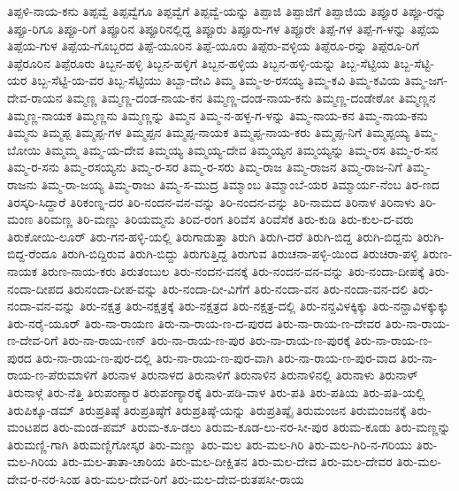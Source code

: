ತಿಪ್ಪಳಿ-ನಾಯ-ಕನು
ತಿಪ್ಪವ್ವೆ
ತಿಪ್ಪವ್ವೆಗೂ
ತಿಪ್ಪವ್ವೆಗೆ
ತಿಪ್ಪವ್ವೆ-ಯನ್ನು
ತಿಪ್ಪಾಜಿ
ತಿಪ್ಪಾಜಿಗೆ
ತಿಪ್ಪಾಜಿಯ
ತಿಪ್ಪೂರ
ತಿಪ್ಪೂ-ರನ್ನು
ತಿಪ್ಪೂ-ರಿಗೂ
ತಿಪ್ಪೂ-ರಿಗೆ
ತಿಪ್ಪೂರಿನ
ತಿಪ್ಪೂರಿನಲ್ಲಿದ್ದ
ತಿಪ್ಪೂರು
ತಿಪ್ಪೂರು-ಗಳ
ತಿಪ್ಪೂರೇ
ತಿಪ್ಪೆ-ಗಳ
ತಿಪ್ಪೆ-ಗ-ಳನ್ನು
ತಿಪ್ಪೆಯ
ತಿಪ್ಪೆಯ-ಗುಳ
ತಿಪ್ಪೆಯ-ಗೊಬ್ಬರದ
ತಿಪ್ಪೆ-ಯೂರಿನ
ತಿಪ್ಪೆ-ಯೂರು
ತಿಪ್ಪೆರು-ವಳ್ಳಿಯ
ತಿಪ್ಪೆರೂ-ರನ್ನು
ತಿಪ್ಪೆರೂ-ರಿಗೆ
ತಿಪ್ಪೆರೂರಿನ
ತಿಪ್ಪೆರೂರು
ತಿಬ್ಬನ-ಹಳ್ಳಿ
ತಿಬ್ಬನ-ಹಳ್ಳಿಗೆ
ತಿಬ್ಬನ-ಹಳ್ಳಿಯ
ತಿಬ್ಬನ-ಹಳ್ಳಿ-ಯನ್ನು
ತಿಬ್ಬ-ಸೆಟ್ಟಿಯ
ತಿಬ್ಬ-ಸೆಟ್ಟಿ-ಯರ
ತಿಬ್ಬ-ಸೆಟ್ಟಿ-ಯ-ವರ
ತಿಬ್ಬ-ಸೆಟ್ಟಿಯು
ತಿಬ್ಬಾ-ದೇವಿ
ತಿಮ್ಮ
ತಿಮ್ಮ-ಅ-ರಸಯ್ಯ
ತಿಮ್ಮ-ಕವಿ
ತಿಮ್ಮ-ಕವಿಯ
ತಿಮ್ಮ-ಜಗ-ದೇವ-ರಾಯನ
ತಿಮ್ಮಣ್ಣ
ತಿಮ್ಮಣ್ಣ-ದಂಡ-ನಾಯ-ಕನ
ತಿಮ್ಮಣ್ಣ-ದಂಡ-ನಾಯ-ಕನು
ತಿಮ್ಮಣ್ಣ-ದಂಡೇಠೋ
ತಿಮ್ಮಣ್ಣನ
ತಿಮ್ಮಣ್ಣ-ನಾಯಕ
ತಿಮ್ಮಣ್ಣನು
ತಿಮ್ಮಣ್ಣನ್ನು
ತಿಮ್ಮನ
ತಿಮ್ಮ-ನ-ಹಳ್ಳ-ಗ-ಳನ್ನು
ತಿಮ್ಮ-ನಾಯ-ಕನ
ತಿಮ್ಮ-ನಾಯ-ಕನು
ತಿಮ್ಮನು
ತಿಮ್ಮಪ್ಪ
ತಿಮ್ಮಪ್ಪ-ಗಳ
ತಿಮ್ಮಪ್ಪನ
ತಿಮ್ಮಪ್ಪ-ನಾಯಕ
ತಿಮ್ಮಪ್ಪ-ನಾಯ-ಕರು
ತಿಮ್ಮಪ್ಪ-ನಿಗೆ
ತಿಮ್ಮಪ್ಪಯ್ಯ
ತಿಮ್ಮ-ಬೋಯಿ
ತಿಮ್ಮಮ್ಮ
ತಿಮ್ಮ-ಯ-ದೇವ
ತಿಮ್ಮಯ್ಯ
ತಿಮ್ಮಯ್ಯ-ದೇವ
ತಿಮ್ಮಯ್ಯನ
ತಿಮ್ಮಯ್ಯನ್ನು
ತಿಮ್ಮ-ರಸ
ತಿಮ್ಮ-ರ-ಸನ
ತಿಮ್ಮ-ರ-ಸನು
ತಿಮ್ಮ-ರಸಯ್ಯನು
ತಿಮ್ಮ-ರ-ಸರ
ತಿಮ್ಮ-ರ-ಸರು
ತಿಮ್ಮ-ರಾಜ
ತಿಮ್ಮ-ರಾಜನ
ತಿಮ್ಮ-ರಾಜ-ನಿಗೆ
ತಿಮ್ಮ-ರಾಜನು
ತಿಮ್ಮ-ರಾ-ಜಯ್ಯ
ತಿಮ್ಮ-ರಾಜು
ತಿಮ್ಮ-ಸ-ಮುದ್ರ
ತಿಮ್ಮಾಂಬ
ತಿಮ್ಮಾಂಬೆ-ಯರ
ತಿಮ್ಮಾರ್ಯ-ನೆಂಬ
ತಿರ-ಣದ
ತಿರಸ್ಕರಿ-ಸಿದ್ದಾರೆ
ತಿರಿಕಂಣ್ನ-ದರ
ತಿರಿ-ನಂದನ-ವನ-ವನ್ನು
ತಿರಿ-ನಂದನ-ವನ್ನು
ತಿರಿ-ನಾಮದ
ತಿರಿನಾಳ
ತಿರಿನಾಳು
ತಿರಿ-ಮಂಣ
ತಿರಿಮಣ್ಣ
ತಿರಿ-ಮಣ್ಣು
ತಿರಿಯಮ್ಮನು
ತಿರಿವ-ರಂಗ
ತಿರಿವೆಸ
ತಿರಿವೆಸೆಕ
ತಿರು-ಕುಡಿ
ತಿರು-ಕುಲ-ದ-ವರು
ತಿರುಕೋಯಿ-ಲೂರ್
ತಿರು-ಗನ-ಹಳ್ಳಿ-ಯಲ್ಲಿ
ತಿರುಗಾಡುತ್ತಾ
ತಿರುಗಿ
ತಿರುಗಿ-ದರೆ
ತಿರುಗಿ-ಬಿದ್ದ
ತಿರುಗಿ-ಬಿದ್ದನು
ತಿರುಗಿ-ಬಿದ್ದ-ರೆಂದೂ
ತಿರುಗಿ-ಬಿದ್ದಿರುವ
ತಿರುಗಿ-ಬಿದ್ದು
ತಿರುಗುತ್ತಿದ್ದ
ತಿರುಗುವ
ತಿರುಚನಾ-ಪಳ್ಳಿ-ಯಿಂದ
ತಿರುಚಿರಾ-ಪಳ್ಳಿ
ತಿರುಣ-ನಾಯಕ
ತಿರುಣ-ನಾಯ-ಕರು
ತಿರುತಂಬುಲ
ತಿರು-ನಂದನ-ವನಕ್ಕೆ
ತಿರು-ನಂದನ-ವನ-ವನ್ನು
ತಿರು-ನಂದಾ-ದೀಪಕ್ಕೆ
ತಿರು-ನಂದಾ-ದೀಪದ
ತಿರುನಂದಾ-ದೀಪ-ವನ್ನು
ತಿರು-ನಂದಾ-ದೀ-ವಿಗೆಗೆ
ತಿರು-ನಂದಾ-ವನ
ತಿರು-ನಂದಾ-ವನ-ದಲಿ
ತಿರು-ನಂದಾ-ವನ-ವನ್ನು
ತಿರು-ನಕ್ಷತ್ರ
ತಿರು-ನಕ್ಷತ್ರಕ್ಕೆ
ತಿರು-ನಕ್ಷತ್ರದ
ತಿರು-ನಕ್ಷತ್ರ-ದಲ್ಲಿ
ತಿರು-ನನ್ದವಿಳಕ್ಕಿಕ್ಕು
ತಿರು-ನನ್ದಾವಿಳಕ್ಕುಕ್ಕು
ತಿರು-ನರೈ-ಯೂರ್
ತಿರು-ನಾ-ರಾಯಣ
ತಿರು-ನಾ-ರಾಯ-ಣ-ದ-ಪುರದ
ತಿರು-ನಾ-ರಾಯ-ಣ-ದೇವರ
ತಿರು-ನಾ-ರಾಯ-ಣ-ದೇವ-ರಿಗೆ
ತಿರು-ನಾ-ರಾಯ-ಣನ್
ತಿರು-ನಾ-ರಾಯ-ಣ-ಪುರ
ತಿರು-ನಾ-ರಾಯ-ಣ-ಪುರಕ್ಕೆ
ತಿರು-ನಾ-ರಾಯ-ಣ-ಪುರದ
ತಿರು-ನಾ-ರಾಯ-ಣ-ಪುರ-ದಲ್ಲಿ
ತಿರು-ನಾ-ರಾಯ-ಣ-ಪುರ-ವಾಗಿ
ತಿರು-ನಾ-ರಾಯ-ಣ-ಪುರ-ವಾದ
ತಿರು-ನಾ-ರಾಯ-ಣ-ಪೆರುಮಾಳಿಗೆ
ತಿರುನಾಳ
ತಿರುನಾಳದ
ತಿರುನಾಳಿಗೆ
ತಿರುನಾಳಿನ
ತಿರುನಾಳಿನಲ್ಲಿ
ತಿರುನಾಳು
ತಿರುನಾಳ್
ತಿರುನಾಳ್ಗೆ
ತಿರು-ನೆತ್ತಿ
ತಿರುಪಂಣ್ಯಾರ
ತಿರುಪಂಣ್ಯಾರಕ್ಕೆ
ತಿರು-ಪಡಿ-ವಾಳ
ತಿರು-ಪತಿ
ತಿರು-ಪತಿಯ
ತಿರು-ಪತಿ-ಯಲ್ಲಿ
ತಿರುಪಿಕ್ಕೂ-ಡಮ್
ತಿರುಪ್ರತಿಷ್ಠೆ
ತಿರುಪ್ರತಿಷ್ಠೆಗೆ
ತಿರುಪ್ರತಿಷ್ಠೆ-ಯನ್ನು
ತಿರುಪ್ರತಿಷ್ಠೈ
ತಿರುಮಂಜನ
ತಿರುಮಂಜನಕ್ಕೆ
ತಿರು-ಮಂಟಪದ
ತಿರು-ಮಂಡ-ಪಮ್
ತಿರುಮ-ಕೂ-ಡಲು
ತಿರುಮ-ಕೂಡ-ಲು-ನರ-ಸೀ-ಪುರ
ತಿರುಮ-ಕೂಡು
ತಿರು-ಮಣ್ಣನ್ನು
ತಿರುಮಣ್ಣಿ-ಗಾಗಿ
ತಿರುಮಣ್ಣಿಗೋಸ್ಕರ
ತಿರು-ಮಣ್ಣು
ತಿರು-ಮಲ
ತಿರು-ಮಲ-ಗಿರಿ
ತಿರು-ಮಲ-ಗಿರಿ-ನ-ಗರಿಯು
ತಿರು-ಮಲ-ಗಿರಿಯ
ತಿರು-ಮಲ-ತಾತಾ-ಚಾರಿಯ
ತಿರು-ಮಲ-ದೀಕ್ಷಿತನ
ತಿರು-ಮಲ-ದೇವ
ತಿರು-ಮಲ-ದೇವರ
ತಿರು-ಮಲ-ದೇವ-ರ-ನರ-ಸಿಂಹ
ತಿರು-ಮಲ-ದೇವ-ರಿಗೆ
ತಿರು-ಮಲ-ದೇವ-ರುತಪಸೀ-ರಾಯ
